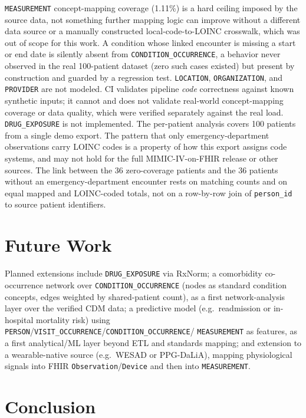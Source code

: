 \documentclass[11pt]{article}
\begin{document}
\texttt{MEASUREMENT}
concept-mapping coverage (1.11\%) is a hard ceiling imposed by the source
data, not something further mapping logic can improve without a different
data source or a manually constructed local-code-to-LOINC crosswalk, which
was out of scope for this work. A condition whose linked encounter is
missing a start or end date is silently absent from
\texttt{CONDITION\_OCCURRENCE}, a behavior never observed in the real
100-patient dataset (zero such cases existed) but present by construction
and guarded by a regression test. \texttt{LOCATION}, \texttt{ORGANIZATION},
and \texttt{PROVIDER} are not modeled. CI validates pipeline
\emph{code} correctness against known synthetic inputs; it cannot and does
not validate real-world concept-mapping coverage or data quality, which
were verified separately against the real load. \texttt{DRUG\_EXPOSURE} is
not implemented. The per-patient analysis covers 100 patients from a single
demo export. The pattern that only emergency-department observations carry
LOINC codes is a property of how this export assigns code systems, and may
not hold for the full MIMIC-IV-on-FHIR release or other sources. The link
between the 36 zero-coverage patients and the 36 patients without an
emergency-department encounter rests on matching counts and on equal
mapped and LOINC-coded totals, not on a row-by-row join of \texttt{person\_id}
to source patient identifiers.

\section{Future Work}
\label{sec:future}

Planned extensions include \texttt{DRUG\_EXPOSURE} via RxNorm; a
comorbidity co-occurrence network over \texttt{CONDITION\_OCCURRENCE}
(nodes as standard condition concepts, edges weighted by shared-patient
count), as a first network-analysis layer over the verified CDM data; a
predictive model (e.g.\ readmission or in-hospital mortality risk) using
\texttt{PERSON}/\texttt{VISIT\_OCCURRENCE}/\texttt{CONDITION\_OCCURRENCE}/
\texttt{MEASUREMENT} as features, as a first analytical/ML layer beyond
ETL and standards mapping; and extension to a wearable-native source (e.g.\
WESAD or PPG-DaLiA), mapping physiological signals into FHIR
\texttt{Observation}/\texttt{Device} and then into \texttt{MEASUREMENT}.

\section{Conclusion}
\end{document}
